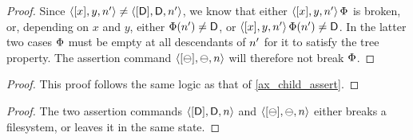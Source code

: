\begin{myaxproof}
\axaxchildassert
\end{myaxproof}

\begin{proof}
Since $\langle{[x],y,n'}\rangle\neq\langle{[\mathsf{D}],\mathsf{D},n'}\rangle$, we know that
either $\langle{[x],y,n'}\rangle\,\Phi$ is broken, or, depending on $x$ and $y$,
either $\Phi(n')\neq\mathsf{D}$, or $\langle{[x],y,n'}\rangle\,\Phi(n')\neq\mathsf{D}$.
In the latter two cases $\Phi$ must be empty at all descendants of $n'$
for it to satisfy the tree property.
The assertion command $\langle{[\ominus],\ominus,n}\rangle$ will therefore not break $\Phi$.
\end{proof}

\begin{myaxproof}
\axaxparentassert
\end{myaxproof}

\begin{proof}
This proof follows the same logic as that of \cref{ax_child_assert}.
\end{proof}

\begin{myaxproof}
\axaxassert
\end{myaxproof}

\begin{proof}
The two assertion commands $\langle{[\mathsf{D}],\mathsf{D},n}\rangle$ and $\langle{[\ominus],\ominus,n}\rangle$ either
breaks a filesystem, or leaves it in the same state.
\end{proof}
